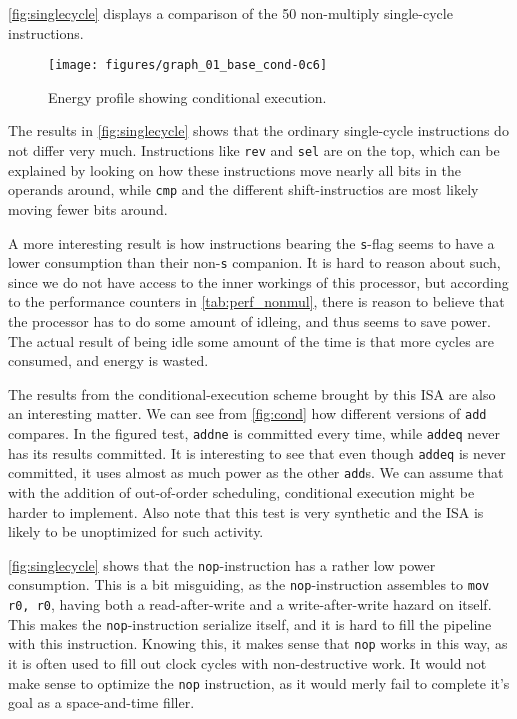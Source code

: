 \autoref{fig:singlecycle} displays a comparison of the 50 non-multiply
single-cycle instructions.

\begin{figure}
    \centering
    \texttt{[image: figures/graph\_01\_base\_cond-0c6]}
    \caption{Energy profile showing conditional execution.}
    \label{fig:cond}
\end{figure}

The results in \autoref{fig:singlecycle} shows that the ordinary single-cycle
instructions do not differ very much. Instructions like \texttt{rev} and
\texttt{sel} are on the top, which can be explained by looking on how these
instructions move nearly all bits in the operands around, while \texttt{cmp} and
the different shift-instructios are most likely moving fewer bits around.

A more interesting result is how instructions bearing the \texttt{s}-flag seems
to have a lower consumption than their non-\texttt{s} companion. It is hard to
reason about such, since we do not have access to the inner workings of this
processor, but according to the performance counters in
\autoref{tab:perf_nonmul}, there is reason to believe that the processor has to
do some amount of idleing, and thus seems to save power. The actual result of
being idle some amount of the time is that more cycles are consumed, and energy
is wasted.

The results from the conditional-execution scheme brought by this ISA are also
an interesting matter. We can see from \autoref{fig:cond} how different versions
of \texttt{add} compares. In the figured test, \texttt{addne} is committed every
time, while \texttt{addeq} never has its results committed. It is interesting to
see that even though \texttt{addeq} is never committed, it uses almost as much
power as the other \texttt{add}s. We can assume that with the addition of
out-of-order scheduling, conditional execution might be harder to implement.
Also note that this test is very synthetic and the ISA is likely to be
unoptimized for such activity.

\autoref{fig:singlecycle} shows that the \texttt{nop}-instruction has a rather
low power consumption. This is a bit misguiding, as the \texttt{nop}-instruction
assembles to \texttt{mov r0, r0}, having both a read-after-write and a
write-after-write hazard on itself. This makes the \texttt{nop}-instruction
serialize itself, and it is hard to fill the pipeline with this instruction.
Knowing this, it makes sense that \texttt{nop} works in this way, as it is often
used to fill out clock cycles with non-destructive work. It would not make sense
to optimize the \texttt{nop} instruction, as it would merly fail to complete
it's goal as a space-and-time filler.

